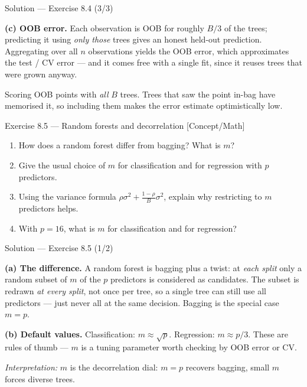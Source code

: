 \documentclass[aspectratio=169,11pt]{beamer}
\begin{document}
\begin{frame}{Solution --- Exercise 8.4 (3/3)}
\begin{solutionbox}
\medskip
\textbf{(c) OOB error.} Each observation is OOB for roughly $B/3$ of the trees; predicting it using \emph{only those} trees gives an honest held-out prediction. Aggregating over all $n$ observations yields the OOB error, which approximates the test / CV error --- and it comes free with a single fit, since it reuses trees that were grown anyway.
\end{solutionbox}
\begin{mistake}
Scoring OOB points with \emph{all} $B$ trees. Trees that saw the point in-bag have memorised it, so including them makes the error estimate optimistically low.
\end{mistake}
\end{frame}

\begin{frame}{Exercise 8.5 --- Random forests and decorrelation [Concept/Math]}
\begin{exercise}
\begin{enumerate}
  \item How does a random forest differ from bagging? What is $m$?
  \item Give the usual choice of $m$ for classification and for regression with $p$ predictors.
  \item Using the variance formula $\rho\sigma^2+\frac{1-\rho}{B}\sigma^2$, explain why restricting to $m$ predictors helps.
  \item With $p=16$, what is $m$ for classification and for regression?
\end{enumerate}
\end{exercise}
\end{frame}

\begin{frame}{Solution --- Exercise 8.5 (1/2)}
\begin{solutionbox}
\textbf{(a) The difference.} A random forest is bagging plus a twist: at \emph{each split} only a random subset of $m$ of the $p$ predictors is considered as candidates. The subset is redrawn \emph{at every split}, not once per tree, so a single tree can still use all predictors --- just never all at the same decision. Bagging is the special case $m=p$.

\medskip
\textbf{(b) Default values.} Classification: $m\approx\sqrt{p}$. Regression: $m\approx p/3$. These are rules of thumb --- $m$ is a tuning parameter worth checking by OOB error or CV.

\medskip
\emph{Interpretation:} $m$ is the decorrelation dial: $m=p$ recovers bagging, small $m$ forces diverse trees.
\end{solutionbox}
\end{frame}
\end{document}
